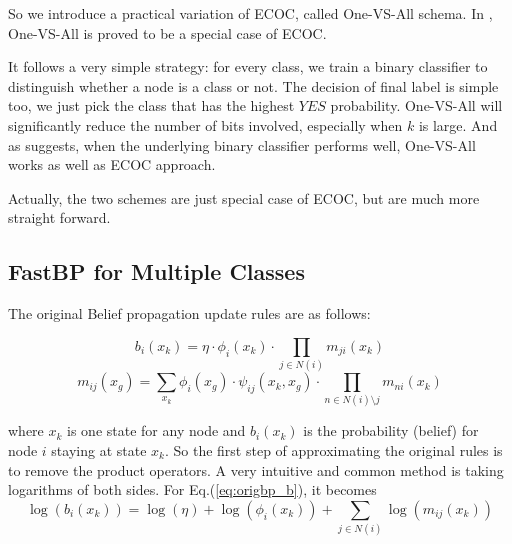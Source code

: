 So we introduce a practical variation of ECOC, called One-VS-All schema. In \cite{Erin2000}, One-VS-All is proved to be a special case of ECOC.

It follows a very simple strategy: for every class, we train a binary classifier to distinguish whether a node is a class or not. The decision of final label is simple too, we just pick the class that has the highest $YES$ probability. One-VS-All will significantly reduce the number of bits involved, especially when $k$ is large. And as \cite{Ryan2000} suggests, when the underlying binary classifier performs well, One-VS-All works as well as ECOC approach.


Actually, the two schemes are just special case of ECOC, but are much more straight forward.


\subsection{FastBP for Multiple Classes}
The original Belief propagation update rules are as follows:

\begin{equation}
\label{eq:origbp_b}
b_i(x_k) = \eta\cdot \phi_i(x_k)\cdot\mathop{\prod}_{j\in N(i)}m_{ji}(x_k)
\end{equation}
\begin{equation}
\label{eq:origbp_m}
m_{ij}(x_g)=\mathop{\sum}_{x_k}\phi_{i}(x_g)\cdot \psi_{ij}(x_k,x_g)\cdot\mathop{\prod}_{n\in N(i)\setminus j} m_{ni}(x_k)
\end{equation}

where $x_k$ is one state for any node and $b_i(x_k)$ is the probability (belief) for node $i$ staying at state $x_k$. So the first step of approximating the original rules is to remove the product operators. A very intuitive and common method is taking logarithms of both sides. For Eq.(\ref{eq:origbp_b}), it becomes
\begin{equation}
\log(b_i(x_k)) = \log(\eta) + \log(\phi_i(x_k)) + \mathop{\sum}_{j\in N(i)}\log(m_{ij}(x_k))
\end{equation}


